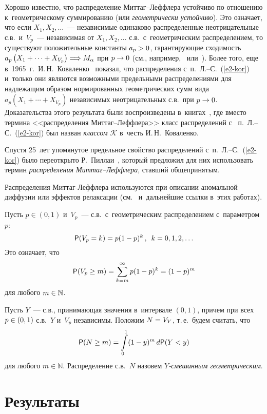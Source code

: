 \begin{multicols}{2}
Хорошо известно, что распределение Мит\-таг--Леф\-фле\-ра устойчиво по
отношению к~геометрическому суммированию (или {\it геометрически
\mbox{устойчиво}}). Это означает, что если $X_1,X_2,\ldots$~--- независимые
одинаково распределенные неотрицательные с.в.\ и~$V_p$~---
независимая от $X_1,X_2,\ldots$ с.в.\ с~геометрическим распределением,
то существуют положительные константы $a_p\hm>0$, гарантирующие
сходимость $a_p\left(X_1+\cdots+X_{V_p}\right)\hm\Longrightarrow
M_{\alpha}$ при $p\hm\to 0$ (см., например,~\cite{Bunge1996} 
или~\cite{KlebanovRachev1996}). Более того, еще 
в~1965~г.\ И.\,Н.~Коваленко~\cite{Kovalenko1965} показал, что распределения 
с~п.~Л.--С.~(\ref{e2-kor}) и~только они являются возможными предельными
распределениями для надлежащим образом нормированных геометрических
сумм вида $a_p\left(X_1+\cdots+X_{V_p}\right)$ независимых
не\-от\-ри\-ца\-тель\-ных с.в.\ при $p\hm\to0$. Доказательства этого результата
были воспроизведены в~книгах~\cite{GnedenkoKorolev1996, GnedenkoKovalenko1968,
GnedenkoKovalenko1989}, где вместо
термина <<распределения Мит\-таг--Леф\-фле\-ра>> класс распределений 
с~ п.~Л.--С.~(\ref{e2-kor}) был назван {\it классом} $\mathcal{K}$ в~честь 
И.\,Н.~Коваленко.

Спустя 25~лет упомянутое предельное свойство
распределений с~п.~Л.--С.~(\ref{e2-kor}) было переоткрыто 
Р.~Пиллаи~\cite{Pillai1989, Pillai1990}, который предложил для них
использовать термин {\it распределения Мит\-таг--Леф\-фле\-ра}, ставший
общепринятым.

Распределения Миттаг-Леф\-фле\-ра используются при описании аномальной
диффузии или эффектов релаксации (см.~\cite{WeronKotulski1996, GorenfloMainardi2006} 
и~дальнейшие ссылки в~этих работах).

Пусть $p\in(0,1)$ и~$V_p$~--- с.в.\ с~геометрическим распределением 
с~параметром~$p$:
\begin{equation}
{\sf P}(V_p=k)=p(1-p)^{k}\,,\enskip k=0,1,2,\ldots
\label{e4-kor}
\end{equation}
Это означает, что
$$
{\sf P}(V_p\ge m)=\sum\limits_{k=m}^{\infty}p(1-p)^{k}=(1-p)^{m}
$$
для любого $m\hm\in\mathbb{N}$.

Пусть $Y$~--- с.в., принимающая значения в~интервале $(0,1)$, причем
при всех $p\hm\in(0,1)$ с.в.~$Y$ и~$V_p$ независимы. Положим
$N\hm=V_{Y}$, т.\,е.\ будем считать, что
$$
{\sf P}(N\ge m)=\int\limits_{0}^{1}(1-y)^{m}\,d{\sf P}(Y<y)
$$
для любого $m\in\mathbb{N}$. Распределение с.в.~$N$ назовем {\it
$Y$-сме\-шан\-ным геометрическим}.

\section{Результаты}


\end{multicols}
